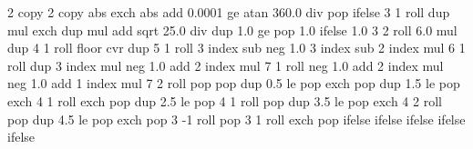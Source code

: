 %
%
%



%
%

{\pgfpoint{-50bp}{-50bp}}
{\pgfpoint{50bp}{50bp}}
{}
{ %
  2 copy %
  2 copy abs exch abs add 0.0001 ge 
  {atan 360.0 div} %
  { pop } %
  ifelse  %
  3 1 roll %
  dup mul %
  exch dup mul %
  add sqrt %
  25.0 div %
  dup 1.0 ge %
  { pop 1.0 }{} ifelse %
  1.0 %
  3 2 roll 6.0 mul dup 4 1 roll %
  floor cvr  %
  dup 5 1 roll %
  3 index sub neg %
  1.0 3 index sub %
  2 index mul %
  6 1 roll %
  dup 3 index mul neg 1.0 add %
  2 index mul %
  7 1 roll %
  neg 1.0 add %
  2 index mul neg 1.0  add %
  1 index mul %
  7 2 roll %
  pop pop %
  dup 0.5 le %
  { %
    pop exch pop
  }
  { dup 1.5 le %
    { %
      pop exch 4 1 roll exch pop
    }
    { dup 2.5 le %
      { %
        pop 4 1 roll pop
      }
      { dup 3.5 le %
        { %
          pop exch 4 2 roll pop
        }
        { dup 4.5 le %
          { %
            pop exch pop 3 -1 roll
          }
          { %
            pop 3 1 roll exch pop
          }
          ifelse
        }
        ifelse %
      }
      ifelse %
    }
    ifelse %
  }
  ifelse %
}

